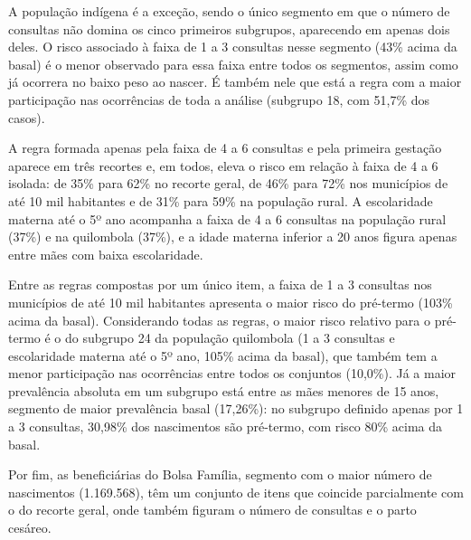
 
A população indígena é a exceção, sendo o único segmento em que o número de consultas não domina os cinco primeiros subgrupos, aparecendo em apenas dois deles. O risco associado à faixa de 1 a 3 consultas nesse segmento (43\% acima da basal) é o menor observado para essa faixa entre todos os segmentos, assim como já ocorrera no baixo peso ao nascer. É também nele que está a regra com a maior participação nas ocorrências de toda a análise (subgrupo 18, com 51,7\% dos casos).
 
A regra formada apenas pela faixa de 4 a 6 consultas e pela primeira gestação aparece em três recortes e, em todos, eleva o risco em relação à faixa de 4 a 6 isolada: de 35\% para 62\% no recorte geral, de 46\% para 72\% nos municípios de até 10 mil habitantes e de 31\% para 59\% na população rural. A escolaridade materna até o 5º ano acompanha a faixa de 4 a 6 consultas na população rural (37\%) e na quilombola (37\%), e a idade materna inferior a 20 anos figura apenas entre mães com baixa escolaridade.
 
Entre as regras compostas por um único item, a faixa de 1 a 3 consultas nos municípios de até 10 mil habitantes apresenta o maior risco do pré-termo (103\% acima da basal). 
Considerando todas as regras, o maior risco relativo para o pré-termo é o do subgrupo 24 da população quilombola (1 a 3 consultas e escolaridade materna até o 5º ano, 105\% acima da basal), que também tem a menor participação nas ocorrências entre todos os conjuntos (10,0\%). Já a maior prevalência absoluta em um subgrupo está entre as mães menores de 15 anos, segmento de maior prevalência basal (17,26\%): no subgrupo definido apenas por 1 a 3 consultas, 30,98\% dos nascimentos são pré-termo, com risco 80\% acima da basal.
 
Por fim, as beneficiárias do Bolsa Família, segmento com o maior número de nascimentos (1.169.568), têm um conjunto de itens que coincide parcialmente com o do recorte geral, onde também figuram o número de consultas e o parto cesáreo.

\FloatBarrier
